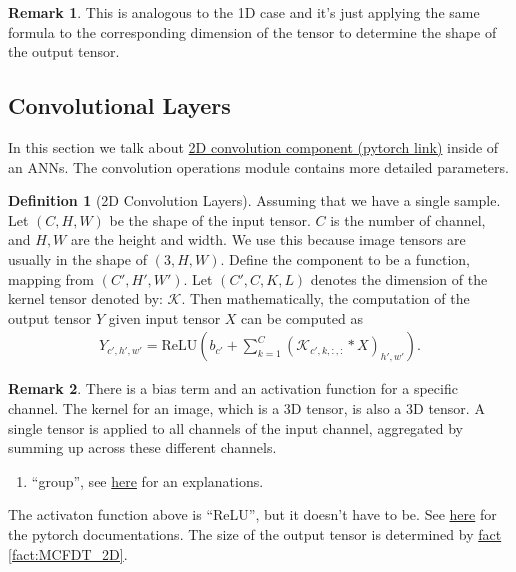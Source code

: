 \documentclass[]{article}
\theoremstyle{definition}
\newtheorem{definition}{Definition}
\newtheorem{remark}{Remark}[subsection]
{
    \newtheorem{assumption}{Assumption}
}
\numberwithin{equation}{subsection}
\begin{document}
        \begin{remark}
            This is analogous to the 1D case and it's just applying the same formula to the corresponding dimension of the tensor to determine the shape of the output tensor. 
        \end{remark}

    \subsection{Convolutional Layers}
        In this section we talk about \href{https://pytorch.org/docs/stable/generated/torch.nn.Conv2d.html}{2D convolution component (pytorch link)} inside of an ANNs. 
        The convolution operations module contains more detailed parameters. 
        \begin{definition}[2D Convolution Layers]
            Assuming that we have a single sample. 
            Let $(C, H, W)$ be the shape of the input tensor. 
            $C$ is the number of channel, and $H, W$ are the height and width. 
            We use this because image tensors are usually in the shape of $(3, H, W)$. 
            Define the component to be a function, mapping from $(C', H', W')$. 
            Let $(C', C, K, L)$ denotes the dimension of the kernel tensor denoted by: $\mathcal K$. 
            Then mathematically, the computation of the output tensor $Y$ given input tensor $X$ can be computed as
            {\large
            \begin{align}
                Y_{c', h', w'} = 
                \text{ReLU}\left( b_{c'} + 
                \sum_{k = 1}^{C} (\mathcal K_{c',k,:, :} * X)_{h', w'}\right). 
            \end{align}
            }
        \end{definition}

        \begin{remark}
            There is a bias term and an activation function for a specific channel. 
            The kernel for an image, which is a 3D tensor, is also a 3D tensor. 
            A single tensor is applied to all channels of the input channel, aggregated by summing up across these different channels. 
            \begin{enumerate}
                
                \item  ``group'', see \href{https://towardsdatascience.com/conv2d-to-finally-understand-what-happens-in-the-forward-pass-1bbaafb0b148}{here} for an explanations. 
            \end{enumerate}
            The activaton function above is ``ReLU'', but it doesn't have to be. 
            See \href{https://pytorch.org/docs/stable/generated/torch.nn.Conv2d.html}{here} for the pytorch documentations. 
            The size of the output tensor is determined by \hyperref[fact:MCFDT_2D]{fact \ref*{fact:MCFDT_2D}}. 
        \end{remark}
\end{document}
